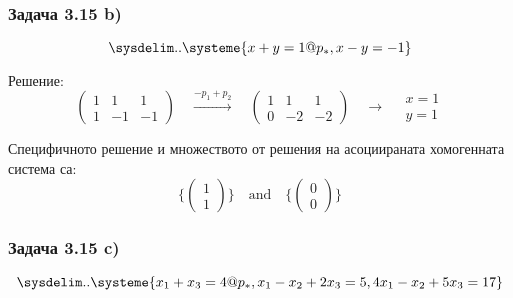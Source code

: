 \documentclass{subfiles}
\begin{document}
\subsubsection{Задача 3.15 b)}

\begin{equation*}
    \sysdelim..\systeme{
        x + y = 1@p_{*},
        x - y = -1
    }
\end{equation*}

\noindent Решение:
\begin{equation*}
    \left(
        \begin{array}{ cc|c }
            1 & 1 & 1 \\
            1 & -1 & -1
        \end{array}
    \right)
    \quad
    \overset{-p_{1}+p_{2}}{\longrightarrow}
    \quad
    \left(
        \begin{array}{ cc|c }
            1 & 1 & 1 \\
            0 & -2 & -2
        \end{array}
    \right)
    \quad
    \longrightarrow
    \quad
    \begin{array}{ c }
        x = 1 \\
        y = 1
    \end{array}
\end{equation*}

\noindent Специфичното решение и множеството от решения на асоциираната хомогенната система са:
\begin{equation*}
    \{
        \left(\begin{array}{ c } 1 \\ 1 \end{array}\right)
    \}
    \quad
    \text{and}
    \quad
    \{
        \left(\begin{array}{ c } 0 \\ 0 \end{array}\right)
    \}
\end{equation*}

\subsubsection{Задача 3.15 c)}

\begin{equation*}
    \sysdelim..\systeme{
        x_{1} + x_{3} = 4@p_{*},
        x_{1} - x_{2} + 2x_{3} = 5,
        4x_{1} - x_{2} + 5x_{3} = 17
    }
\end{equation*}
\end{document}
